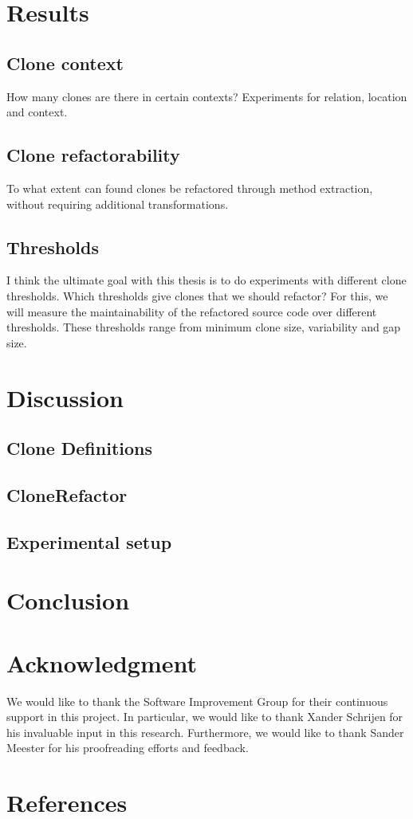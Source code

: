 \documentclass[conference]{IEEEtran}
\begin{document}
\section{Results}

\subsection{Clone context}
How many clones are there in certain contexts? Experiments for relation, location and context.

\subsection{Clone refactorability}
To what extent can found clones be refactored through method extraction, without requiring additional transformations.

\subsection{Thresholds}
I think the ultimate goal with this thesis is to do experiments with different clone thresholds. Which thresholds give clones that we should refactor? For this, we will measure the maintainability of the refactored source code over different thresholds. These thresholds range from minimum clone size, variability and gap size.

\section{Discussion}
\subsection{Clone Definitions}

\subsection{CloneRefactor}

\subsection{Experimental setup}

\section{Conclusion}

\section*{Acknowledgment}
We would like to thank the Software Improvement Group for their continuous support in this project. In particular, we would like to thank Xander Schrijen for his invaluable input in this research. Furthermore, we would like to thank Sander Meester for his proofreading efforts and feedback.

\section*{References}
\end{document}
